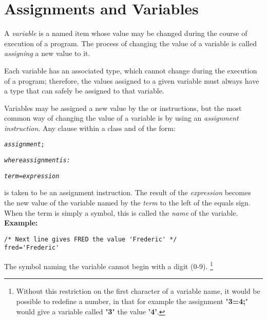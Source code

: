 \chapter{Assignments and Variables}\label{refassign}
\index{,}
 A \emph{variable} is a named item whose value may be changed
during the course of execution of a \nr{} program.
The process of changing the value of a variable is called
\emph{assigning} a new value to it.
 
Each variable has an associated type, which cannot change during the
execution of a program; therefore, the values assigned to a given
variable must always have a type that can safely be assigned to that
variable.

Variables may be assigned a new value by the  or
 instructions, but the most common way of changing the
value of a variable is by using an \emph{assignment instruction}.
Any clause within a class and of the form:
\begin{shaded}
\begin{alltt}
\emph{assignment};

\emph{where \emph{assignment} is:}

\emph{term}=\emph{expression}
\end{alltt}
\end{shaded}
is taken to be an assignment instruction.
The result of the \emph{expression} becomes the new value of the
variable named by the \emph{term} to the left of the equals sign.
When the term is simply a symbol, this is called the \emph{name} of
the variable.
 \textbf{Example:}
\begin{lstlisting}
/* Next line gives FRED the value 'Frederic' */
fred='Frederic'
\end{lstlisting}
The symbol naming the variable cannot begin with a digit (0-9).
\footnote{
Without this restriction on the first character of a variable name,
it would be possible to redefine a number, in that for example the
assignment "\textbf{3=4;}" would give a variable called
"\textbf{3}" the value \textbf{'4'}.
}
 
